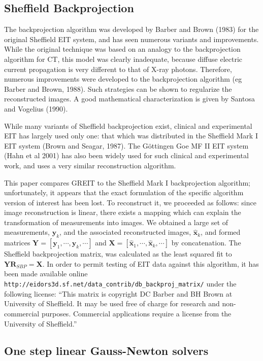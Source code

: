 \documentclass[12pt]{iopart}
\newcommand{\xH}{\mbox{$\mathbf{\hat x}$}}
\newcommand{\yB}{\mbox{$\mathbf{y}$}}
\newcommand{\RB}{\mbox{$\mathbf{R}$}}
\newcommand{\XB}{\mbox{$\mathbf{X}$}}
\newcommand{\YB}{\mbox{$\mathbf{Y}$}}
\begin{document}
\subsection{Sheffield Backprojection}

The backprojection algorithm was developed by 
Barber and Brown (1983) for the original 
Sheffield EIT system, and  has seen numerous 
variants and improvements. While the original
technique was based on an analogy to the backprojection
algorithm for CT, this model was clearly inadequate, because
diffuse electric current propagation is very different
to that of X-ray photons. Therefore, numerous improvements
were developed to the backprojection algorithm
(eg Barber and Brown, 1988). Such strategies
can be shown to regularize the reconstructed images.
A good mathematical characterization is given by
Santosa and Vogelius (1990).

While many variants of Sheffield backprojection exist,
clinical and experimental EIT has largely used only
one: that which was distributed in the
Sheffield Mark I EIT system (Brown and Seagar, 1987).
The G\"ottingen Goe MF II EIT system (Hahn et al 2001)
has also been widely used for such clinical and
experimental work, and uses a very similar reconstruction
algorithm.

This paper compares GREIT to the Sheffield Mark I
backprojection algorithm;
unfortunately, it appears that the exact formulation
of the specific algorithm version of interest has been
lost. To reconstruct it, we proceeded as follows:
since image reconstruction is linear, there exists
a mapping which can explain the transformation of
measurements into images. We obtained a large set of
measurements, $\yB_k$, and the associated
reconstructed images, $\xH_k$, and formed matrices
$\YB = [ \yB_1, \cdots, \yB_k, \cdots]$ and 
$\XB = [ \xH_1, \cdots, \xH_k, \cdots]$ by concatenation.
The Sheffield backprojection matrix, was
calculated as the least squared fit to
   $\YB \RB_{SBP} = \XB$.
In order to permit testing of EIT data against
this algorithm, it has been made available
online 
\verb$http://eidors3d.sf.net/data_contrib/db_backproj_matrix/$
under the following license:
``This matrix is copyright DC Barber and BH Brown at
  University of Sheffield. It may be used free of charge
  for research and non-commercial purposes. Commercial
  applications require a license from the University of Sheffield.''


\subsection{One step linear Gauss-Newton solvers}
\label{subsec:OSLGNS}
\end{document}
